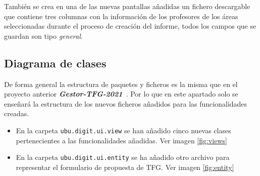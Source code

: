 También se crea en una de las nuevas pantallas añadidas un fichero descargable que contiene tres columnas con la información de los profesores de los áreas seleccionadas durante el proceso de creación del informe, todos los campos que se guardan son tipo \emph{general}.

\subsection{Diagrama de clases}

De forma general la estructura de paquetes y ficheros es la misma que en el proyecto anterior \textbf{\textit{Gestor-TFG-2021}}~\cite{Gestor-TFG-2021}. Por lo que en este apartado solo se enseñará la estructura de los nuevos ficheros añadidos para las funcionalidades creadas.

\begin{itemize}
	\item En la carpeta \texttt{ubu.digit.ui.view} se han añadido cinco nuevas clases pertenecientes a las funcionalidades añadidas. Ver imagen \ref{fig:views}
	
	
	\item En la carpeta \texttt{ubu.digit.ui.entity} se ha añadido otro archivo para representar el formulario de propuesta de TFG. Ver imagen \ref{fig:entity}
	
	
\end{itemize}

